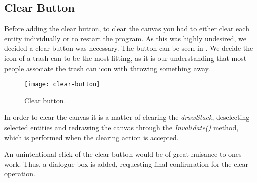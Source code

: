 \subsection{Clear Button}
Before adding the clear button, to clear the canvas you had to either clear each entity individually or to restart the program. 
As this was highly undesired, we decided a clear button was necessary.
The button can be seen in . We decide the icon of a trash can to be the most fitting, as it is our understanding that most people associate the trash can icon with throwing something away.

\begin{figure}[h]
     \centering
     \texttt{[image: clear-button]}
     \caption{Clear button.}
     \label{fig:clear-button}
\end{figure}

In order to clear the canvas it is a matter of clearing the \textit{drawStack}, deselecting selected entities and redrawing the canvas through the \textit{Invalidate()} method, which is performed when the clearing action is accepted.

An unintentional click of the clear button would be of great nuisance to ones work. 
Thus, a dialogue box is added, requesting final confirmation for the clear operation.


